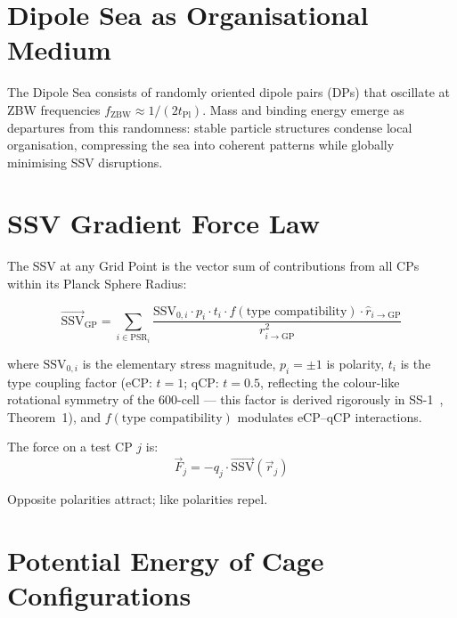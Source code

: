 \documentclass[11pt]{article}
\begin{document}
\section{Dipole Sea as Organisational Medium}

The Dipole Sea consists of randomly oriented dipole pairs (DPs) that
oscillate at ZBW frequencies $f_{\text{ZBW}} \approx 1/(2 t_{\text{Pl}})$.
Mass and binding energy emerge as departures from this randomness: stable
particle structures condense local organisation, compressing the sea into
coherent patterns while globally minimising SSV disruptions.

\section{SSV Gradient Force Law}

The SSV at any Grid Point is the vector sum of contributions from all
CPs within its Planck Sphere Radius:

\begin{equation}
\vec{\text{SSV}}_{\text{GP}} =
\sum_{i \in \text{PSR}_i}
\frac{\text{SSV}_{0,i} \cdot p_i \cdot t_i \cdot
      f(\text{type compatibility}) \cdot \hat{r}_{i \to \text{GP}}}
     {r_{i \to \text{GP}}^2}
\label{eq:ssv_field}
\end{equation}

where $\text{SSV}_{0,i}$ is the elementary stress magnitude, $p_i = \pm 1$
is polarity, $t_i$ is the type coupling factor (eCP: $t=1$; qCP: $t=0.5$,
reflecting the colour-like rotational symmetry of the 600-cell --- this
factor is derived rigorously in SS-1~\cite{abshier_ss}, Theorem~1), and
$f(\text{type compatibility})$ modulates eCP--qCP interactions.

The force on a test CP $j$ is:
\begin{equation}
\vec{F}_j = -q_j \cdot \vec{\text{SSV}}(\vec{r}_j)
\end{equation}

Opposite polarities attract; like polarities repel.

\section{Potential Energy of Cage Configurations}
\end{document}
